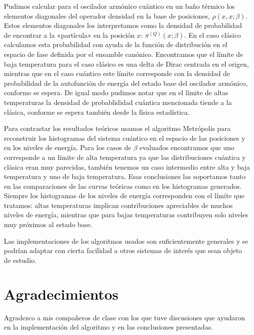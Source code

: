 \documentclass[%
 reprint,
 amsmath,amssymb,
 aps,
 pra,
]{revtex4-2}
\begin{document}
Pudimos calcular para el oscilador armónico cuántico en un baño térmico los elementos diagonales del operador densidad en la base de posiciones, $\rho(x,x;\beta)$. Estos elementos diagonales los interpretamos como la densidad de probabilidad de encontrar a la «partícula» en la posición $x$: $\pi^{(Q)}(x;\beta)$. En el caso clásico calculamos esta probabilidad con ayuda de la función de distribución en el espacio de fase definida por el ensamble canónico. Encontramos que el límite de baja temperatura para el caso clásico es una delta de Dirac centrada en el origen, mientras que en el caso cuántico este límite corresponde con la densidad de probabilidad de la autofunción de energía del estado base del oscilador armónico, conforme se espera. De igual modo pudimos notar que en el límite de altas temperaturas la densidad de probablididad cuántica mencionada tiende a la clásica, conforme se espera también desde la física estadística. 

Para contrastar los resultados teóricos usamos el algoritmo Metrópolis para reconstruir los histogramas del sistema cuántico en el espacio de las posiciones y en los niveles de energía. Para los casos de $\beta$ evaluados encontramos que uno corresponde a un límite de alta temperatura ya que las distribuciones cuántica y clásica eran muy parecidas, también tenemos un caso intermedio entre alta y baja temperatura y uno de baja temperatura. Esas conclusiones las soportamos tanto en las comparaciones de las curvas teóricas como en los histogramas generados. Siempre los histogramas de los niveles de energía corresponden con el límite que tratamos: altas temperaturas implican contribuciones apreciables de muchos niveles de energía, mientras que para bajas temperaturas contribuyen solo niveles muy próximos al estado base.

Las implementaciones de los algoritmos usados son suficientemente generales y se podrían adaptar con cierta facilidad a otros sistemas de interés que sean objeto de estudio.

\section*{Agradecimientos}
Agradezco a mis compañeros de clase con los que tuve discusiones que ayudaron en la implementación del algoritmo y en las conclusiones presentadas.

\nocite{*}

\end{document}
